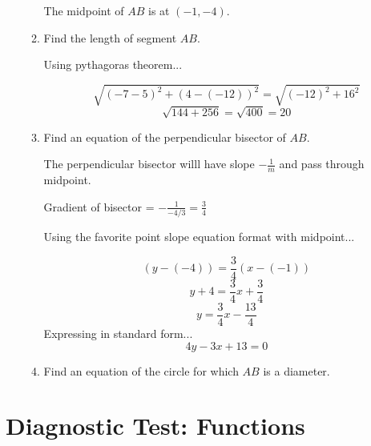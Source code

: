 \documentclass{article}
\begin{document}
\begin{enumerate}
\begin{enumerate}
			The midpoint of $AB$ is at $(-1, -4)$.

	\item Find the length of segment $AB$.

		Using pythagoras theorem...

		$$\sqrt{(-7 - 5)^2 + (4 - (-12))^2} = \sqrt{(-12)^2 + 16^2}$$
		$$\sqrt{144 + 256} = \sqrt{400} = 20$$

	\item Find an equation of the perpendicular bisector of $AB$.

		The perpendicular bisector willl have slope $-\frac{1}{m}$ and pass through midpoint.

		Gradient of bisector = $-\frac{1}{-4/3} = \frac{3}{4}$

		Using the favorite point slope equation format with midpoint...

		$$(y - (-4)) = \frac{3}{4}(x - (-1))$$
		$$y + 4 = \frac{3}{4}x + \frac{3}{4}$$
		$$y = \frac{3}{4}x - \frac{13}{4}$$
		Expressing in standard form...
		$$4y - 3x + 13 = 0$$

	\item Find an equation of the circle for which $AB$ is a diameter.

	\end{enumerate}

\end{enumerate}

\newpage

\section{Diagnostic Test: Functions}
\end{document}
